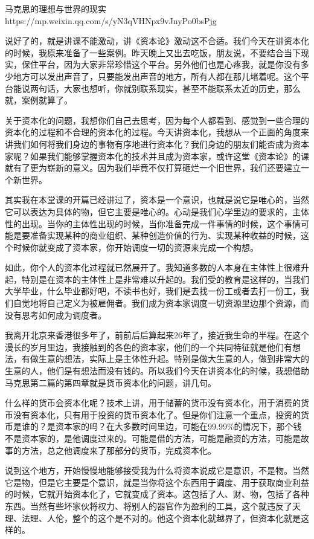 \documentclass[UTF8, 12pt, a4paper]{ctexrep}
\begin{document}
马克思的理想与世界的现实 https://mp.weixin.qq.com/s/yN3qVHNpx9vJnyPo0bsPjg

说好了的，就是讲课不能激动，讲《资本论》激动这不合适。我们今天在讲资本化的时候，我原来准备了一些案例。昨天晚上又出去吃饭，朋友说，不要结合当下现实，保住平台，因为大家非常珍惜这个平台。另外他们也是心疼我，就是你没有多少地方可以发出声音了，只要能发出声音的地方，所有人都在那儿堵着呢。这个平台能说两句话，大家也想听，你就别联系现实，甚至不能联系太近的历史，那么就，案例就算了。

关于资本化的问题，我想你们自己去思考，因为每个人都看到、感觉到一些合理的资本化的过程和不合理的资本化的过程。今天讲资本化，我想从一个正面的角度来讲我们如何将我们身边的事物有序地进行资本化？我们身边的朋友们能否成为资本家呢？如果我们能够掌握资本化的技术并且成为资本家，或许这堂《资本论》的课就有了更为崭新的意义。因为我们毕竟不仅打算砸烂一个旧世界，我们还要建立一个新世界。

其实我在本堂课的开篇已经讲过了，资本是一个意识，也就是说它是唯心的，当然它可以表达为具体的物，但它主要是唯心的。心动是我们心学里边的要求的，主体性的出现。当你的主体性出现的时候，当你准备完成一件事情的时候，这个事情可能是要准备实现某种的商业组织、某种创造价值的行为、实现某种收益的时候，这个时候你就变成了资本家，你开始调度一切的资源来完成一个构想。

如此，你个人的资本化过程就已然展开了。我知道多数的人本身在主体性上很难升起，特别是在资本的主体性上是非常难以升起的。我们受的教育是这样的，当我们大学毕业，什么毕业都好吧，不读书也好，我们是去找一份工或者去打一份工，我们自觉地将自己定义为被雇佣者。我们成为资本家调度一切资源里边那个资源，而没有思考如何成为调度者。

我离开北京来香港很多年了，前前后后算起来26年了，接近我生命的半程。在这个漫长的岁月里边，我接触到的各色的资本家，他们的一个共同特征就是他们有想法，有做生意的想法，实际上是主体性升起。特别是做大生意的人，做到非常大的生意的人，他们是有想法而没有钱的。所以我们今天在讲资本化的时候，我想借助马克思第二篇的第四章就是货币资本化的问题，讲几句。

什么样的货币会资本化呢？技术上讲，用于储蓄的货币没有资本化，用于消费的货币没有资本化，只有用于投资的货币资本化了。但是你们注意一个重点，投资的货币是谁的？是资本家的吗？在大多数时间里边，可能在99.99\%的情况下，那个钱不是资本家的，是他调度过来的。可能是借的方法，可能是融资的方法，可能是故事的方法，总之他调度来了那部分的货币，完成资本化。

说到这个地方，开始慢慢地能够接受我为什么将资本说成它是意识，不是物。当然它是物，但是它主要是个意识，就是当你将这个东西用于调度、用于获取商业利益的时候，它就开始资本化了，它就变成了资本。这包括了人、财、物，包括了各种东西。当然有些坏家伙将权力、将别人的器官作为盈利的工具，这个就违反了天理、法理、人伦，整个的这个是不对的。他这个资本化就越界了，但资本化就是这样的。
\end{document}
